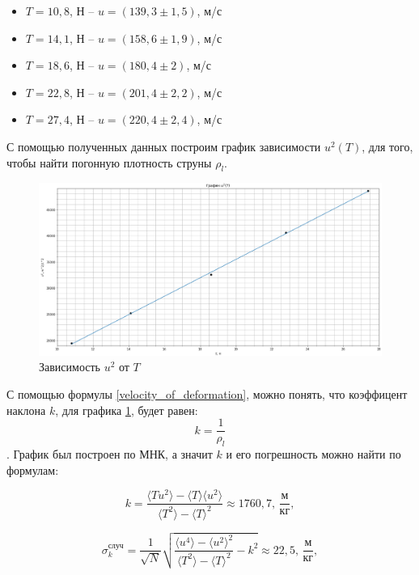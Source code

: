 \documentclass[a4paper,12pt]{article}
\begin{document}
	\begin{itemize}
		\item $T = 10,8$, Н -- $u = (139,3 \pm 1,5)$, м/с
		\item  $T = 14,1$, Н -- $u = (158,6 \pm 1,9)$, м/с
		\item  $T = 18,6$, Н -- $u = (180,4 \pm 2)$, м/с
		\item  $T = 22,8$, Н -- $u = (201,4 \pm 2,2)$, м/с
		\item  $T = 27,4$, Н -- $u = (220,4 \pm 2,4)$, м/с
	\end{itemize}

	С помощью полученных данных построим график зависимости $u^2(T)$, для того, чтобы найти погонную плотность струны $ \rho_l $. 
	
	\begin{figure}[h!]
		\begin{center}
			\includegraphics[scale=0.53]{1.4.5 grapg2}
			\caption{Зависимость $ u^2 $ от $ T $}
			\label{1.4.5 grapg2}
		\end{center}
	\end{figure}

	С помощью формулы \eqref{velocity_of_deformation}, можно понять, что коэффицент наклона $k$, для графика \ref{1.4.5 grapg2}, будет равен: $$k = \dfrac{1}{\rho_l}$$. График был построен по МНК, а значит $k$ и его погрешность можно найти по формулам:
	
	\begin{equation}
		k=\frac{\langle Tu^2\rangle-\langle T\rangle \langle u^2\rangle}{\langle T^2\rangle - \langle T\rangle^2} \approx 1760,7 \text{, $\dfrac{\text{м}}{\text{кг}}$},
	\end{equation}
	
	\begin{equation}
		\sigma_k^\text{случ}=\frac{1}{\sqrt{N}}\sqrt{\frac{\langle u^4 \rangle - \langle u^2 \rangle^2}{\langle T^2 \rangle - \langle T \rangle^2} - k^2  } \approx 22,5\text{, $\dfrac{\text{м}}{\text{кг}}$},
	\end{equation}
	
\end{document}
